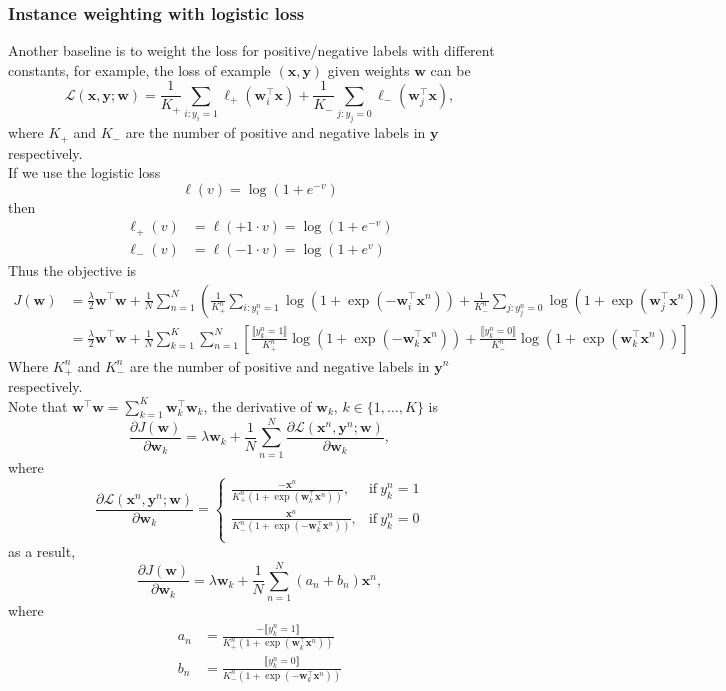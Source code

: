 \documentclass[9pt]{extarticle}
\newcommand{\llb}{\llbracket}
\newcommand{\rrb}{\rrbracket}
\newcommand{\x}{\mathbf{x}}
\newcommand{\y}{\mathbf{y}}
\newcommand{\1}{\mathbf{1}}
\newcommand{\w}{\mathbf{w}}
\newcommand{\LCal}{\mathcal{L}}
\begin{document}
\subsubsection{Instance weighting with logistic loss}
Another baseline is to weight the loss for positive/negative labels with different constants, for example,
the loss of example $(\x, \y)$ given weights $\w$ can be
$$
\LCal(\x, \y; \w) = \frac{1}{K_+} \sum_{i:y_i=1} \ell_+(\w_i^\top \x) + \frac{1}{K_-} \sum_{j:y_j=0} \ell_-(\w_j^\top \x),
$$
where $K_+$ and $K_-$ are the number of positive and negative labels in $\y$ respectively. \\
If we use the logistic loss 
$$
\ell(v) = \log(1 + e^{-v})
$$
then
\begin{align*}
\ell_+(v) &= \ell(+1 \cdot v) = \log(1 + e^{-v}) \\
\ell_-(v) &= \ell(-1 \cdot v) = \log(1 + e^v)
\end{align*}
Thus the objective is
\begin{align*}
J(\w) 
&= \frac{\lambda}{2} \w^\top \w + \frac{1}{N} \sum_{n=1}^N \left(
   \frac{1}{K_+^n} \sum_{i:y_i^n=1} \log \left( 1 + \exp(-\w_i^\top \x^n) \right) + 
   \frac{1}{K_-^n} \sum_{j:y_j^n=0} \log \left( 1 + \exp(\w_j^\top \x^n) \right) \right) \\
&= \frac{\lambda}{2} \w^\top \w + \frac{1}{N} \sum_{k=1}^K \sum_{n=1}^N \left[
   \frac{\llb y_k^n = 1 \rrb}{K_+^n} \log \left( 1 + \exp(-\w_k^\top \x^n) \right) + 
   \frac{\llb y_k^n = 0 \rrb}{K_-^n} \log \left( 1 + \exp(\w_k^\top \x^n) \right) \right] 
\end{align*}
Where $K_+^n$ and $K_-^n$ are the number of positive and negative labels in $\y^n$ respectively. \\
Note that $\w^\top \w = \sum_{k=1}^K \w_k^\top \w_k$, the derivative of $\w_k, \, k \in \{1,\dots,K\}$ is
$$
\frac{\partial J(\w)} {\partial \w_k} = \lambda \w_k + \frac{1}{N} \sum_{n=1}^N \frac{\partial \LCal(\x^n, \y^n; \w)} {\partial \w_k},
$$
where 
$$
\frac{\partial \LCal(\x^n, \y^n; \w)} {\partial \w_k} =
\begin{cases}
\frac{-\x^n} {K_+^n (1 + \exp( \w_k^\top \x^n))}, & \text{if} \ y_k^n = 1 \\
\frac{ \x^n} {K_-^n (1 + \exp(-\w_k^\top \x^n))}, & \text{if} \ y_k^n = 0 \\
\end{cases}
$$
as a result,
$$
\frac{\partial J(\w)} {\partial \w_k} = \lambda \w_k + \frac{1}{N} \sum_{n=1}^N (a_n + b_n) \x^n,
$$
where
\begin{align*}
a_n &= \frac{-\llb y_k^n = 1 \rrb} {K_+^n (1 + \exp( \w_k^\top \x^n))} \\
b_n &= \frac{ \llb y_k^n = 0 \rrb} {K_-^n (1 + \exp(-\w_k^\top \x^n))}
\end{align*}
\end{document}
